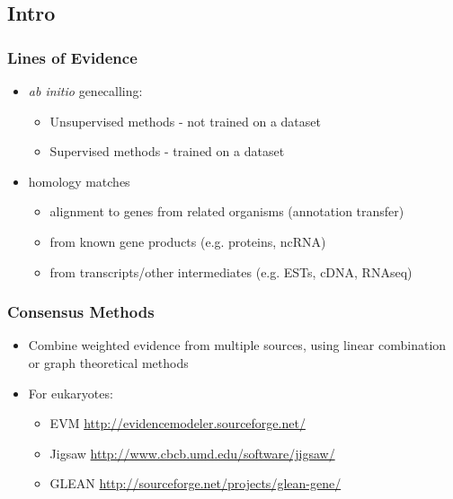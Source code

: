 \documentclass[table]{beamer}
\begin{document}
  \subsection{Intro}
    \begin{frame}
     \frametitle{Lines of Evidence}
     \begin{itemize}
       \item \textit{ab initio} genecalling: 
       \begin{itemize}
         \item Unsupervised methods - not trained on a dataset
         \item Supervised methods - trained on a dataset
       \end{itemize}
       \item homology matches
       \begin{itemize}
         \item alignment to genes from related organisms (annotation transfer)
         \item from known gene products (e.g. proteins, ncRNA)
         \item from transcripts/other intermediates (e.g. ESTs, cDNA, RNAseq)
       \end{itemize}
     \end{itemize}
    \end{frame}
    
    \begin{frame}
     \frametitle{Consensus Methods}
     \begin{itemize}
       \item Combine weighted evidence from multiple sources, using linear combination or graph theoretical methods
       \item For eukaryotes:
       \begin{itemize}
         \item EVM \url{http://evidencemodeler.sourceforge.net/}
         \item Jigsaw \url{http://www.cbcb.umd.edu/software/jigsaw/}
         \item GLEAN \url{http://sourceforge.net/projects/glean-gene/}
       \end{itemize}
     \end{itemize}
    \end{frame}
  
\end{document}
